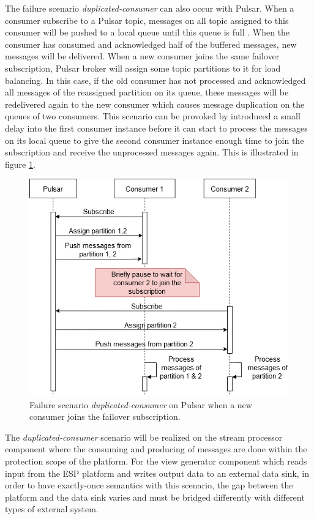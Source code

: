 \fi
The failure scenario \emph{duplicated-consumer} can also occur with Pulsar. When a consumer subscribe to a Pulsar topic, messages on all topic assigned to this consumer will be pushed to a local queue until this queue is full \cite{pulsarbinaryprotocol}. When the consumer has consumed and acknowledged half of the buffered messages, new messages will be delivered. When a new consumer joins the same failover subscription, Pulsar broker will assign some topic partitions to it for load balancing. In this case, if the old consumer has not processed and acknowledged all messages of the reassigned partition on its queue, these messages will be redelivered again to the new consumer which causes message duplication on the queues of two consumers. This scenario can be provoked by introduced a small delay into the first consumer instance before it can start to process the messages on its local queue to give the second consumer instance enough time to join the subscription and receive the unprocessed messages again. This is illustrated in figure \ref{fig:pulsarscenario}.

\begin{figure}[h]
	\centering
	\includegraphics[width=12cm]{images/pulsar-duplicated-scenario.png}
	\caption{Failure scenario \emph{duplicated-consumer} on Pulsar when a new consumer joins the failover subscription.}
	\label{fig:pulsarscenario}
\end{figure}

The \emph{duplicated-consumer} scenario will be realized on the stream processor component where the consuming and producing of messages are done within the protection scope of the platform. For the view generator component which reads input from the ESP platform and writes output data to an external data sink, in order to have exactly-once semantics with this scenario, the gap between the platform and the data sink varies and must be bridged differently with different types of external system.


